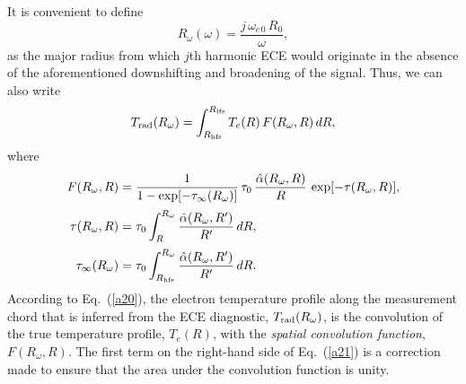 \documentclass{iopjournal}
\begin{document}
It is convenient to define
\begin{equation}
R_\omega(\omega) = \frac{j\,\omega_{c\,0}\,R_0}{\omega},
\end{equation}
as the major radius from which $j$th harmonic ECE would originate in the absence of the aforementioned downshifting and broadening of the signal. 
Thus, we can also write
\begin{equation}\label{a20}
T_{\rm rad}(R_\omega) = \int^{R_{\rm lfs}}_{R_{\rm hfs}}T_e(R)\,F(R_\omega,R)\,dR,
\end{equation}
where
\begin{align}\label{a21}
F(R_\omega,R) &= \frac{1}{1-\exp[-\tau_\infty(R_\omega)]}\,\tau_0\,\frac{\hat{\alpha}(R_\omega,R)}{R}\,\exp[-\tau(R_\omega, R)],\\[0.5ex]
\tau(R_\omega,R) &= \tau_0\int_R^{R_\omega}\frac{\hat{\alpha}(R_\omega,R')}{R'}\,dR,\\[0.5ex]
\tau_\infty(R_\omega) &= \tau_0\int^{R_\omega}_{R_{\rm hfs}}\frac{\hat{\alpha}(R_\omega,R')}{R'}\,dR.\label{tinf}
\end{align}
According to Eq.~(\ref{a20}), the electron temperature profile along the measurement chord that is inferred from the ECE diagnostic, $T_{\rm rad}(R_\omega)$,
is the convolution of the true temperature profile, $T_e(R)$, with the {\em spatial convolution function}, $F(R_\omega,R)$. The first term on the right-hand side of
Eq.~(\ref{a21}) is a correction made to ensure that the area under the convolution function is unity. 
\end{document}
